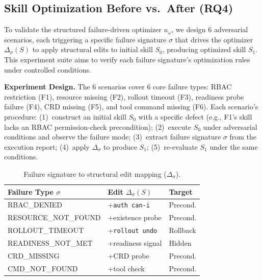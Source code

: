 \documentclass[conference,10pt]{IEEEtran}
\begin{document}
\subsection{Skill Optimization Before vs.\ After (RQ4)}

To validate the structured failure-driven optimizer $u_\omega$, we design 6 adversarial scenarios, each triggering a specific failure signature $\sigma$ that drives the optimizer $\Delta_\sigma(S)$ to apply structural edits to initial skill $S_0$, producing optimized skill $S_1$.
This experiment suite aims to verify each failure signature's optimization rules under controlled conditions.

\textbf{Experiment Design.}
The 6 scenarios cover 6 core failure types: RBAC restriction (F1), resource missing (F2), rollout timeout (F3), readiness probe failure (F4), CRD missing (F5), and tool command missing (F6).
Each scenario's procedure: (1)~construct an initial skill $S_0$ with a specific defect (e.g., F1's skill lacks an RBAC permission-check precondition); (2)~execute $S_0$ under adversarial conditions and observe the failure mode; (3)~extract failure signature $\sigma$ from the execution report; (4)~apply $\Delta_\sigma$ to produce $S_1$; (5)~re-evaluate $S_1$ under the same conditions.

\begin{table}[t]
\centering
\caption{Failure signature to structural edit mapping ($\Delta_\sigma$).}
\label{tab:delta-sigma}
\footnotesize
\setlength{\tabcolsep}{2pt}
\begin{tabular}{lp{2.5cm}l}
\toprule
\textbf{Failure Type $\sigma$} & \textbf{Edit $\Delta_\sigma(S)$} & \textbf{Target} \\
\midrule
RBAC\_DENIED & +\texttt{auth can-i} & Precond. \\
RESOURCE\_NOT\_FOUND & +existence probe & Precond. \\
ROLLOUT\_TIMEOUT & +\texttt{rollout undo} & Rollback \\
READINESS\_NOT\_MET & +readiness signal & Hidden \\
CRD\_MISSING & +CRD probe & Precond. \\
CMD\_NOT\_FOUND & +tool check & Precond. \\
\bottomrule
\end{tabular}
\end{table}
\end{document}
